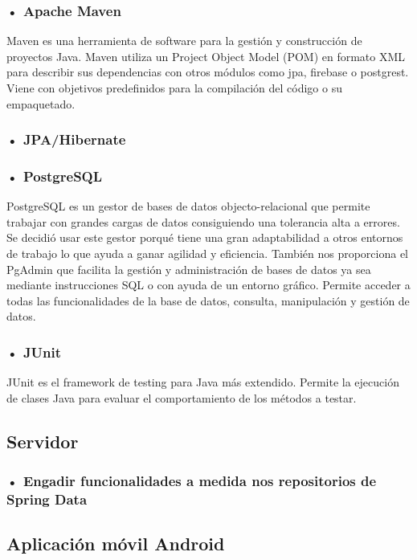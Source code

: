 \subsubsection{• Apache Maven}
Maven es una herramienta de software para la gestión y construcción de proyectos Java.
 Maven utiliza un Project Object Model (POM) en formato
XML para describir sus dependencias con otros módulos como jpa, firebase o postgrest. Viene con objetivos predefinidos para la compilación del código o su empaquetado.




\subsubsection{• JPA/Hibernate}
\subsubsection{• PostgreSQL}

PostgreSQL es un gestor de bases de datos objecto-relacional  que permite trabajar con grandes cargas de datos consiguiendo una tolerancia alta a errores.
Se decidió usar este gestor porqué tiene una gran adaptabilidad a otros entornos de trabajo lo que ayuda a ganar agilidad y eficiencia. También nos proporciona  el PgAdmin que facilita la gestión y administración de bases de datos ya sea mediante instrucciones SQL o con ayuda de un entorno gráfico. Permite acceder a todas las funcionalidades de la base de datos, consulta, manipulación y gestión de datos.
\subsubsection{• JUnit}

JUnit es el framework de testing para Java más extendido.
Permite la ejecución de clases Java para evaluar el comportamiento de los métodos a testar.



\subsection{Servidor}
\subsubsection{• Engadir funcionalidades a medida nos repositorios de Spring Data}
\subsection{Aplicación móvil Android}
